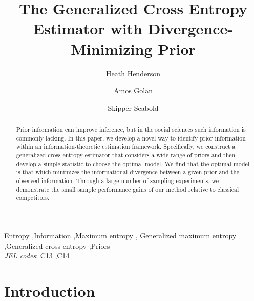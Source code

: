 \documentclass{elsarticle}
\begin{document}
\begin{frontmatter}

\title{The Generalized Cross Entropy Estimator with Divergence-Minimizing 
Prior}

\author[hh]{Heath Henderson}
\author[ag]{Amos Golan}
\author[ss]{Skipper Seabold}

\address[hh]{Department of Economics, Iowa State University}
\address[ag]{Department of Economics, American University}
\address[ss]{Department of Economics, American University}

\begin{abstract}
Prior information can improve inference, but in the social sciences such
information is commonly lacking.
In this paper, we develop a novel way to identify prior information within 
an information-theoretic estimation framework. 
Specifically, we construct a generalized cross entropy estimator that considers a 
wide range of priors and then develop a simple statistic to choose the optimal 
model. 
We find that the optimal model is that which minimizes the informational 
divergence between a given prior and the observed information. 
Through a large number of sampling experiments, we demonstrate the 
small sample performance gains of our method relative to classical competitors.
\end{abstract}

\begin{keyword}
Entropy \sep Information \sep Maximum entropy \sep 
Generalized maximum entropy \sep Generalized cross entropy \sep Priors \\
\textit{JEL codes}: C13 \sep C14  
\end{keyword}

\end{frontmatter}

\doublespacing


\section{Introduction}
\label{sec: intro}
\end{document}
